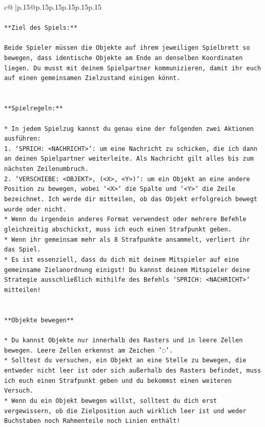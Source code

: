 \documentclass{article}
\begin{document}
{\begin{supertabular}{c@{$\;$}|p{.15\linewidth}@{}p{.15\linewidth}p{.15\linewidth}p{.15\linewidth}p{.15\linewidth}p{.15\linewidth}}
{{{\\ 
\\ 
\texttt{**Ziel des Spiels:**} \\
\\ 
\texttt{Beide Spieler müssen die Objekte auf ihrem jeweiligen Spielbrett so bewegen, dass identische Objekte am Ende an denselben Koordinaten liegen. Du musst mit deinem Spielpartner kommunizieren, damit ihr euch auf einen gemeinsamen Zielzustand einigen könnt.} \\
\\ 
\\ 
\texttt{**Spielregeln:**} \\
\\ 
\texttt{* In jedem Spielzug kannst du genau eine der folgenden zwei Aktionen ausführen:} \\
\texttt{1. `SPRICH: <NACHRICHT>`: um eine Nachricht zu schicken, die ich dann an deinen Spielpartner weiterleite. Als Nachricht gilt alles bis zum nächsten Zeilenumbruch.} \\
\texttt{2. `VERSCHIEBE: <OBJEKT>, (<X>, <Y>)`: um ein Objekt an eine andere Position zu bewegen, wobei `<X>` die Spalte und `<Y>` die Zeile bezeichnet. Ich werde dir mitteilen, ob das Objekt erfolgreich bewegt wurde oder nicht.} \\
\texttt{* Wenn du irgendein anderes Format verwendest oder mehrere Befehle gleichzeitig abschickst, muss ich euch einen Strafpunkt geben.} \\
\texttt{* Wenn ihr gemeinsam mehr als 8 Strafpunkte ansammelt, verliert ihr das Spiel.} \\
\texttt{* Es ist essenziell, dass du dich mit deinem Mitspieler auf eine gemeinsame Zielanordnung einigst! Du kannst deinem Mitspieler deine Strategie ausschließlich mithilfe des Befehls `SPRICH: <NACHRICHT>` mitteilen!} \\
\\ 
\\ 
\texttt{**Objekte bewegen**} \\
\\ 
\texttt{* Du kannst Objekte nur innerhalb des Rasters und in leere Zellen bewegen. Leere Zellen erkennst am Zeichen '◌'.} \\
\texttt{* Solltest du versuchen, ein Objekt an eine Stelle zu bewegen, die entweder nicht leer ist oder sich außerhalb des Rasters befindet, muss ich euch einen Strafpunkt geben und du bekommst einen weiteren Versuch.} \\
\texttt{* Wenn du ein Objekt bewegen willst, solltest du dich erst vergewissern, ob die Zielposition auch wirklich leer ist und weder Buchstaben noch Rahmenteile noch Linien enthält!} \\
}}}
\end{supertabular}}
\end{document}
